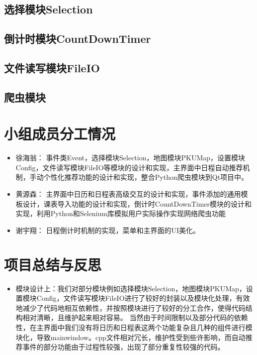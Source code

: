 \documentclass[11pt,hyperref,a4paper,UTF8]{ctexart}
\begin{document}
\begin{CJK}{UTF8}{gkai}
\subsection{ 选择模块Selection}

\subsection{ 倒计时模块CountDownTimer}

\subsection{ 文件读写模块FileIO}

\subsection{ 爬虫模块}

\section{ 小组成员分工情况}
\begin{itemize}
    \item 徐海翁： 事件类Event，选择模块Selection，地图模块PKUMap，设置模块Config，文件读写模块FileIO等模块的设计和实现，主界面中日程自动推荐机制，手动个性化推荐功能的设计和实现，整合Python爬虫模块到Qt项目中。
    \item 黄源森： 主界面中日历和日程表高级交互的设计和实现，事件添加的通用模板设计，课表导入功能的设计和实现，倒计时CountDownTimer模块的设计和实现，利用Python和Selenium库模拟用户实际操作实现网络爬虫功能
    \item 谢宇翔： 日程倒计时机制的实现，菜单和主界面的UI美化。
\end{itemize}

\section{ 项目总结与反思}

\begin{itemize}
    \item 模块设计上：我们对部分模块例如选择模块Selection，地图模块PKUMap，设置模块Config，文件读写模块FileIO进行了较好的封装以及模块化处理，有效地减少了代码地相互依赖性，并按照模块进行了较好的分工合作，使得代码结构相对清晰，且维护起来相对容易。
    当然由于时间限制以及部分代码的依赖性，在主界面中我们没有将日历和日程表这两个功能复杂且几种的组件进行模块化，导致mainwindow。cpp文件相对冗长，维护性受到些许影响，而自动推荐事件的部分功能由于过程性较强，出现了部分重复性较强的代码。
    

\end{itemize}
\end{CJK}
\end{document}
